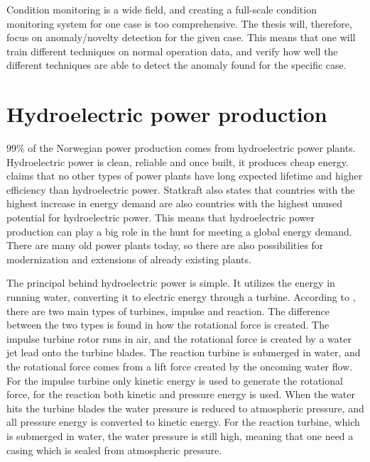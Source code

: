     Condition monitoring is a wide field, and creating a full-scale condition monitoring system for one case is too comprehensive. The thesis will, therefore, focus on anomaly/novelty detection for the given case. This means that one will train different techniques on normal operation data, and verify how well the different techniques are able to detect the anomaly found for the specific case. 
    
\section{Hydroelectric power production}\label{ref:sec_hydropower}
    $99\%$ of the Norwegian power production comes from hydroelectric power plants. Hydroelectric power is clean, reliable and once built, it produces cheap energy. \cite{Statkraft2009} claims that no other types of power plants have long expected lifetime and higher efficiency than hydroelectric power. Statkraft also states that countries with the highest increase in energy demand are also countries with the highest unused potential for hydroelectric power. This means that hydroelectric power production can play a big role in the hunt for meeting a global energy demand. There are many old power plants today, so there are also possibilities for modernization and extensions of already existing plants. 
    
    The principal behind hydroelectric power is simple. It utilizes the energy in running water, converting it to electric energy through a turbine. According to \cite{Paish2002}, there are two main types of turbines, impulse and reaction. The difference between the two types is found in how the rotational force is created. The impulse turbine rotor runs in air, and the rotational force is created by a water jet lead onto the turbine blades. The reaction turbine is submerged in water, and the rotational force comes from a lift force created by the oncoming water flow. For the impulse turbine only kinetic energy is used to generate the rotational force, for the reaction both kinetic and pressure energy is used. When the water hits the turbine blades the water pressure is reduced to atmospheric pressure, and all pressure energy is converted to kinetic energy. For the reaction turbine, which is submerged in water, the water pressure is still high, meaning that one need a casing which is sealed from atmospheric pressure. 
    
    
